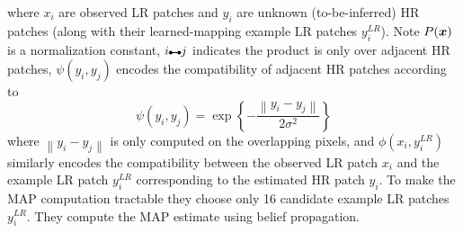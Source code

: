 where $x_i$ are observed LR patches and $y_i$ are unknown (to-be-inferred) HR patches (along with their learned-mapping example LR patches $y_i^{LR}$).
%
Note $P(\bm{x})$ is a normalization constant, $i\ue{} j$ indicates the product is only over adjacent HR patches, $\psi(y_i, y_j)$ encodes the compatibility of adjacent HR patches according to
\begin{equation}
    \psi(y_i, y_j) = \exp \left\{ -  \frac{\left\| y_i - y_j \right\|}{2\sigma^2} \right\}
\end{equation}
where $\left\| y_i - y_j \right\|$ is only computed on the overlapping pixels, and $\phi(x_i, y_i^{LR})$ similarly encodes the compatibility between the observed LR patch $x_i$ and the example LR patch $y_i^{LR}$ corresponding to the estimated HR patch $y_i$.
%
To make the MAP computation tractable they choose only 16 candidate example LR patches $y_i^{LR}$.
%
They compute the MAP estimate using belief propagation.

